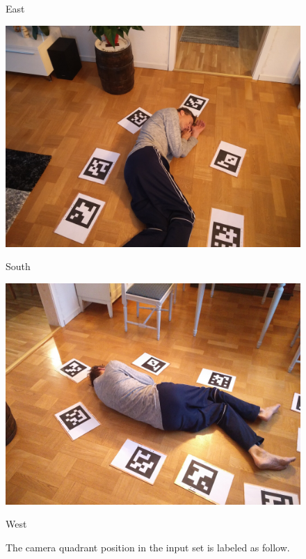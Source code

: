 \begin{figure}
\begin{center}
\begin{minipage}[t]{0.2\textwidth}
        \caption*{East}
    \end{minipage}
    \begin{minipage}[t]{0.2\textwidth}
        \includegraphics[width=\textwidth]{images/datasets/P2/images/093551.jpg}
        \caption*{South}
    \end{minipage}
    \begin{minipage}[t]{0.2\textwidth}
        \includegraphics[width=\textwidth]{images/datasets/P2/images/093335.jpg}
        \caption*{West}
    \end{minipage}
\end{center}
\caption[Camera quadrant position]{The camera quadrant position in the input set is labeled as follow.}
\label{fig:camera_pos_lables}
\end{figure}

